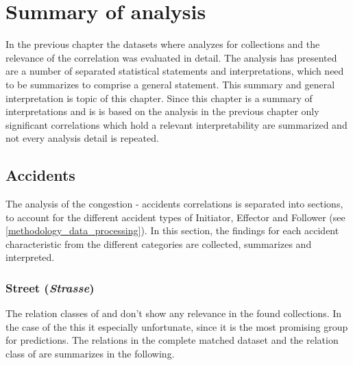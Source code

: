 \chapter{Summary of analysis}
\label{analysis_summary}
In the previous chapter the datasets where analyzes for collections and the relevance of the correlation was evaluated in detail. The analysis has presented are a number of separated statistical statements and interpretations, which need to be summarizes to comprise a general statement. This summary and general interpretation is topic of this chapter. Since this chapter is a summary of interpretations and is is based on the analysis in the previous chapter only significant correlations which hold a relevant interpretability are summarized and not every analysis detail is repeated.

\section{Accidents}
The analysis of the congestion - accidents correlations is separated into sections, to account for the different accident types of Initiator, Effector and Follower (see \cref{methodology_data_processing}). In this section, the findings for each accident characteristic from the different categories are collected, summarizes and interpreted. 

\subsection{Street (\textit{Strasse})}
\label{analysis_sum_Strasse}
The relation classes of  and  don't show any relevance in the found collections. In the case of the  this it especially unfortunate, since it is the most promising group for predictions. The relations in the complete matched dataset and the relation class of  are summarizes in the following.

